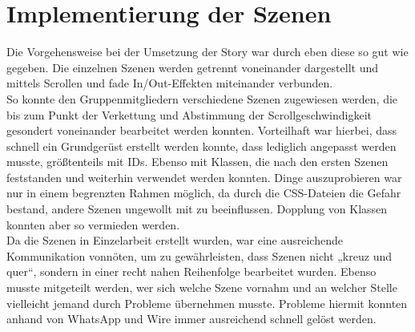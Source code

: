 \section{Implementierung der Szenen}
Die Vorgehensweise bei der Umsetzung der Story war durch eben diese so gut wie gegeben. Die einzelnen Szenen werden getrennt voneinander dargestellt und mittels Scrollen und fade In/Out-Effekten miteinander verbunden.\\
So konnte den Gruppenmitgliedern verschiedene Szenen zugewiesen werden, die bis zum Punkt der Verkettung und Abstimmung der Scrollgeschwindigkeit gesondert voneinander bearbeitet werden konnten.
Vorteilhaft war hierbei, dass schnell ein Grundgerüst erstellt werden konnte, dass lediglich angepasst werden musste, größtenteils mit IDs. Ebenso mit Klassen, die nach den ersten Szenen feststanden und weiterhin verwendet werden konnten. Dinge auszuprobieren war nur in einem begrenzten Rahmen möglich, da durch die CSS-Dateien die Gefahr bestand, andere Szenen ungewollt mit zu beeinflussen. Dopplung von Klassen konnten aber so vermieden werden. \\
Da die Szenen in Einzelarbeit erstellt wurden, war eine ausreichende Kommunikation vonnöten, um zu gewährleisten, dass Szenen nicht „kreuz und quer“, sondern in einer recht nahen Reihenfolge bearbeitet wurden. Ebenso musste mitgeteilt werden, wer sich welche Szene vornahm und an welcher Stelle vielleicht jemand durch Probleme übernehmen musste. Probleme hiermit konnten anhand von WhatsApp und Wire immer ausreichend schnell gelöst werden. 
